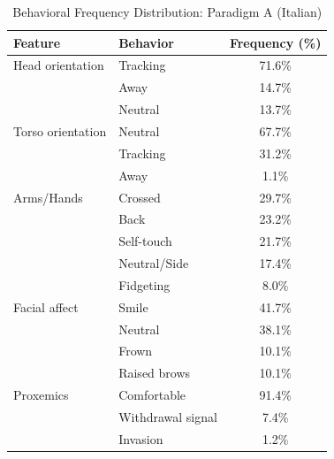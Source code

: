 \begin{table}[ht]
\centering
\caption{Behavioral Frequency Distribution: Paradigm A (Italian)}
\begin{tabular}{llc}
\toprule
Feature & Behavior & Frequency (\%) \\
\midrule
Head orientation & Tracking & 71.6\% \\
 & Away & 14.7\% \\
 & Neutral & 13.7\% \\
Torso orientation & Neutral & 67.7\% \\
 & Tracking & 31.2\% \\
 & Away & 1.1\% \\
Arms/Hands & Crossed & 29.7\% \\
 & Back & 23.2\% \\
 & Self-touch & 21.7\% \\
 & Neutral/Side & 17.4\% \\
 & Fidgeting & 8.0\% \\
Facial affect & Smile & 41.7\% \\
 & Neutral & 38.1\% \\
 & Frown & 10.1\% \\
 & Raised brows & 10.1\% \\
Proxemics & Comfortable & 91.4\% \\
 & Withdrawal signal & 7.4\% \\
 & Invasion & 1.2\% \\
\bottomrule
\end{tabular}
\end{table}